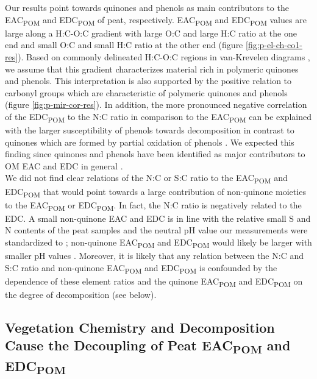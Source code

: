 \documentclass[alpha-refs]{wiley-article-rmd}
\begin{document}
\begin{refsection}
Our results point towards quinones and phenols as main contributors to the EAC\textsubscript{POM} and EDC\textsubscript{POM} of peat, respectively. EAC\textsubscript{POM} and EDC\textsubscript{POM} values are large along a H:C-O:C gradient with large O:C and large H:C ratio at the one end and small O:C and small H:C ratio at the other end (figure \ref{fig:p-el-ch-co1-res}). Based on commonly delineated H:C-O:C regions in van-Krevelen diagrams \autocite{Kim.2003}, we assume that this gradient characterizes material rich in polymeric quinones and phenols. This interpretation is also supported by the positive relation to carbonyl groups which are characteristic of polymeric quinones and phenols \autocite{ElMansouri.2007} (figure \ref{fig:p-mir-cor-res}). In addition, the more pronounced negative correlation of the EDC\textsubscript{POM} to the N:C ratio in comparison to the EAC\textsubscript{POM} can be explained with the larger susceptibility of phenols towards decomposition in contrast to quinones which are formed by partial oxidation of phenols \autocite{Fenner.2011,Aeschbacher.2012,Bolton.2018}. We expected this finding since quinones and phenols have been identified as major contributors to OM EAC and EDC in general \autocite{Ratasuk.2007,Aeschbacher.2010,Aeschbacher.2012}.\\
We did not find clear relations of the N:C or S:C ratio to the EAC\textsubscript{POM} and EDC\textsubscript{POM} that would point towards a large contribution of non-quinone moieties to the EAC\textsubscript{POM} or EDC\textsubscript{POM}. In fact, the N:C ratio is negatively related to the EDC. A small non-quinone EAC and EDC is in line with the relative small S and N contents of the peat samples and the neutral pH value our measurements were standardized to \autocite{Fimmen.2007,HernandezMontoya.2012}; non-quinone EAC\textsubscript{POM} and EDC\textsubscript{POM} would likely be larger with smaller pH values \autocite{Fimmen.2007,HernandezMontoya.2012,Aeschbacher.2012}. Moreover, it is likely that any relation between the N:C and S:C ratio and non-quinone EAC\textsubscript{POM} and EDC\textsubscript{POM} is confounded by the dependence of these element ratios and the quinone EAC\textsubscript{POM} and EDC\textsubscript{POM} on the degree of decomposition \autocite{Biester.2014} (see below).

\hypertarget{vegetation-chemistry-and-decomposition-cause-the-decoupling-of-peat-eac-and-edc}{%
\subsection{\texorpdfstring{Vegetation Chemistry and Decomposition Cause the Decoupling of Peat EAC\textsubscript{POM} and EDC\textsubscript{POM}}{Vegetation Chemistry and Decomposition Cause the Decoupling of Peat EAC and EDC}}\label{vegetation-chemistry-and-decomposition-cause-the-decoupling-of-peat-eac-and-edc}}


\end{refsection}
\end{document}
